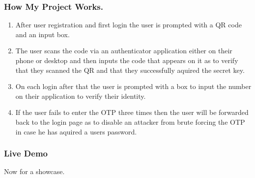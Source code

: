 \documentclass{beamer}
\begin{document}
\begin{frame}

    \frametitle{How My Project Works.}
    \begin{enumerate}
        \item 
            After user registration and first login the user is prompted with a QR code and an input box.
        \item 
            The user scans the code via an authenticator application either on their phone or desktop and then inputs the code that appears on it as to verify that they scanned the QR and that they successfully aquired the secret key.
        \item 
            On each login after that the user is prompted with a box to input the number on their application to verify their identity.
        \item 
            If the user fails to enter the OTP three times then the user will be forwarded back to the login page as to disable an attacker from brute forcing the OTP in case he has aquired a users password.
    \end{enumerate}

\end{frame}

\begin{frame}

    \frametitle{Live Demo}
    Now for a showcase.
\end{frame}
\end{document}
